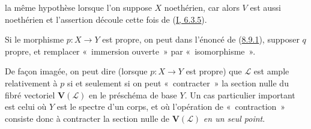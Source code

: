 la même hypothèse lorsque l'on suppose $X$ noethérien, car alors $V$ est aussi
noethérien et l'assertion découle cette fois de
(\hyperref[I.6.3.5-fr]{I, 6.3.5}).

\begin{corollary}[8.9.2]
\label{II.8.9.2-fr}
Si le morphisme $p:X\to Y$ est propre, on peut dans l'énoncé de
(\hyperref[II.8.9.1-fr]{8.9.1}), supposer $q$ propre, et remplacer
«~immersion ouverte~» par «~isomorphisme~».
\end{corollary}

De façon imagée, on peut dire (lorsque $p:X\to Y$ est propre) que
$\mathcal{L}$ est ample relativement à $p$ si et seulement si on peut
«~contracter~» la section nulle du fibré vectoriel $\mathbf{V}(\mathcal{L})$
en le préschéma de base $Y$. Un cas particulier important est celui où $Y$
est le spectre d'un corps, et où l'opération de «~contraction~» consiste donc
à contracter la section nulle de $\mathbf{V}(\mathcal{L})$ \emph{en un seul
point}.

